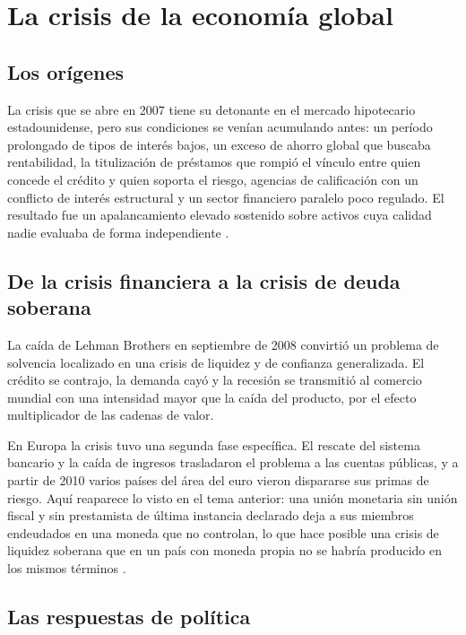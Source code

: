 \section{La crisis de la economía global}

\subsection{Los orígenes}

La crisis que se abre en 2007 tiene su detonante en el mercado hipotecario
estadounidense, pero sus condiciones se venían acumulando antes: un período
prolongado de tipos de interés bajos, un exceso de ahorro global que buscaba
rentabilidad, la titulización de préstamos que rompió el vínculo entre quien
concede el crédito y quien soporta el riesgo, agencias de calificación con un
conflicto de interés estructural y un sector financiero paralelo poco regulado.
El resultado fue un apalancamiento elevado sostenido sobre activos cuya calidad
nadie evaluaba de forma independiente \parencite{requeijo2010}.

\subsection{De la crisis financiera a la crisis de deuda soberana}

La caída de Lehman Brothers en septiembre de 2008 convirtió un problema de
solvencia localizado en una crisis de liquidez y de confianza generalizada. El
crédito se contrajo, la demanda cayó y la recesión se transmitió al comercio
mundial con una intensidad mayor que la caída del producto, por el efecto
multiplicador de las cadenas de valor.

En Europa la crisis tuvo una segunda fase específica. El rescate del sistema
bancario y la caída de ingresos trasladaron el problema a las cuentas públicas,
y a partir de 2010 varios países del área del euro vieron dispararse sus primas
de riesgo. Aquí reaparece lo visto en el tema anterior: una unión monetaria sin
unión fiscal y sin prestamista de última instancia declarado deja a sus miembros
endeudados en una moneda que no controlan, lo que hace posible una crisis de
liquidez soberana que en un país con moneda propia no se habría producido en los
mismos términos \parencite{saezlozano2010}.

\subsection{Las respuestas de política}


